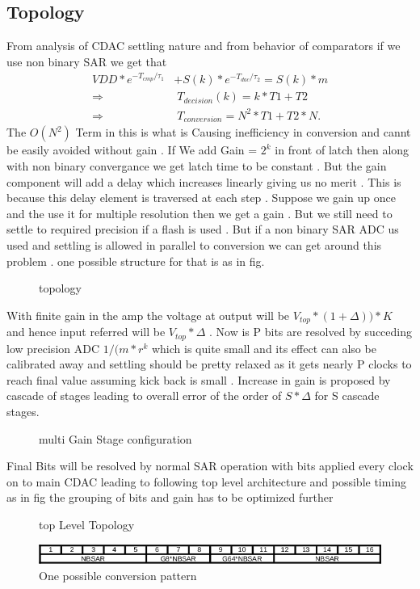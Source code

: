 \documentclass[a4paper,10pt,fleqn,titlepage,twoside]{article}
\begin{document}
\subsection*{Topology}
From analysis of CDAC settling nature and from behavior of comparators if we use non binary SAR we get that 
\begin{align*}
VDD*e^{-T_{cmp}/\tau_1}&+S(k)*e^{-T_{dac}/\tau_2} = S(k)*m\\
\Rightarrow &\;T_{decision}(k) = k*T1+T2\\
\Rightarrow &\;T_{conversion} = N^2*T1+T2*N.
\end{align*}
The $O(N^{2})$ Term in this is what is Causing inefficiency in conversion and cannt be easily avoided without gain . If We add Gain = $2^{k}$ in front
of latch then along with non binary convergance we get latch time to be constant . But the gain component will add a delay which increases linearly 
giving us no merit . This is because this delay element is traversed at each step . Suppose we gain up once and the use it for multiple resolution then
we get a gain . But we still need to settle to required precision if a flash is used . But if a non binary SAR ADC us used and settling is allowed in 
parallel to conversion we can get around this problem . one possible structure for that is as in fig.
\begin{figure}[h]
\centering
\setlength\fboxsep{5.0pt}
\setlength\fboxrule{0.5pt}
\caption{topology}
\label{fig:ampArch}
\end{figure}
With finite gain in the amp the voltage at output will be $V_{top}*(1+\Delta))*K$ and hence input referred will be $V_{top}*\Delta$ . Now is P bits are resolved by succeding low precision ADC
$1/(m*r^{k}$  which is quite small and its effect can also be calibrated away and settling should be pretty relaxed as it gets nearly P clocks to reach final value assuming kick back is small . 
Increase in gain is proposed by cascade of stages leading to overall error of the order of $S*\Delta$  for S cascade stages.
\begin{figure}[h]
\centering
\setlength\fboxsep{5.0pt}
\setlength\fboxrule{0.5pt}
\caption{multi Gain Stage configuration}
\label{fig:ampMulti}
\end{figure}
Final Bits will be resolved by normal SAR operation with bits applied every clock on to main CDAC leading to following top level architecture and possible timing as in fig the grouping of bits and 
gain has to be optimized further
\begin{figure}[htbp]
\centering
\setlength\fboxsep{5.0pt}
\setlength\fboxrule{0.5pt}
\caption{top Level Topology}
\label{fig:topArch}
\end{figure}
\begin{figure}[htbp]
\centering
\includegraphics[width=1.0\linewidth]{./img/timing.png}
\caption{One possible conversion pattern}
\label{fig:toptiming}
\end{figure}
\end{document}
